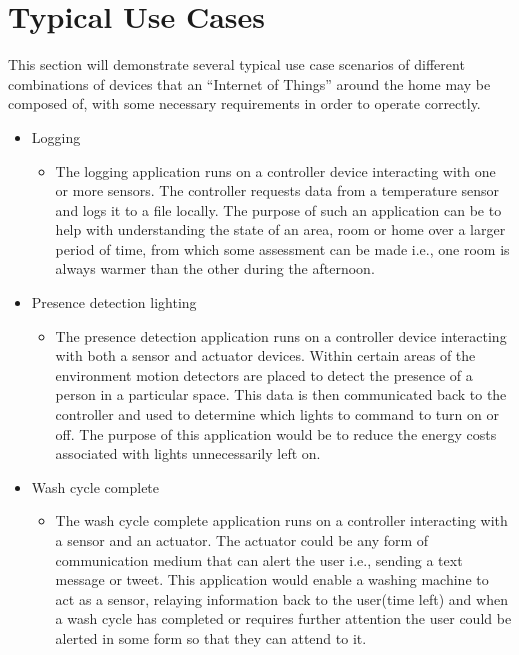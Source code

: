 \section{Typical Use Cases} %
\label{sec:typical_use_cases}
This section will demonstrate several typical use case scenarios of different combinations of devices that an ``Internet of Things'' around the home may be composed of, with some necessary requirements in order to operate correctly.

\begin{itemize}
	\item Logging %
	\begin{itemize}
		\item The logging application runs on a controller device interacting with one or more sensors. The controller requests data from a temperature sensor and logs it to a file locally. The purpose of such an application can be to help with understanding the state of an area, room or home over a larger period of time, from which some assessment can be made i.e., one room is always warmer than the other during the afternoon. 
	\end{itemize}
	\item Presence detection lighting %
	\begin{itemize}
		\item The presence detection application runs on a controller device interacting with both a sensor and actuator devices. Within certain areas of the environment motion detectors are placed to detect the presence of a person in a particular space. This data is then communicated back to the controller and used to determine which lights to command to turn on or off. The purpose of this application would be to reduce the energy costs associated with lights unnecessarily left on.
	\end{itemize}
	\item Wash cycle complete
	\begin{itemize}
		\item The wash cycle complete application runs on a controller interacting with a sensor and an actuator. The actuator could be any form of communication medium that can alert the user i.e., sending a text message or tweet. This application would enable a washing machine to act as a sensor, relaying information back to the user(time left) and when a wash cycle has completed or requires further attention the user could be alerted in some form so that they can attend to it.

\end{itemize}
\end{itemize}
